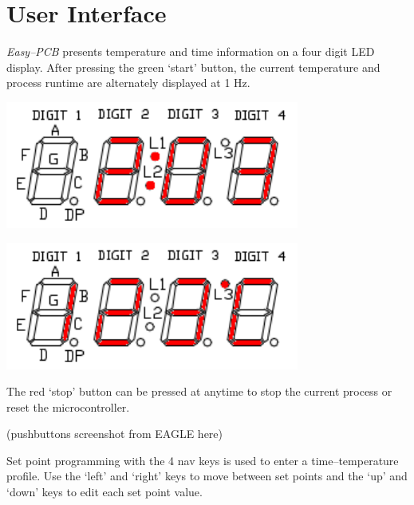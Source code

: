 \documentclass[10pt, twocolumn]{article}
\begin{document}
\tableofcontents

\section{User Interface}

\emph{Easy--PCB} presents temperature and time information on a four digit LED display.
After pressing the green `start' button, the current temperature and process
runtime are alternately displayed at 1 Hz.

\begin{center}
	\begin{minipage}[b]{0.5\columnwidth}
		\centering
		\includegraphics[width=\textwidth]{Figures/clock-display.pdf}
	\end{minipage}
	\begin{minipage}[b]{0.5\columnwidth}
		\centering
		\includegraphics[width=\textwidth]{Figures/temperature-display.pdf}
	\end{minipage}	
\end{center}

The red `stop' button can be pressed at anytime to stop the current process
or reset the microcontroller.

(pushbuttons screenshot from EAGLE here)

Set point programming with the 4 nav keys is used to enter a time--temperature profile.
Use the `left' and `right' keys to move between set points and the `up' and `down'
keys to edit each set point value.
\end{document}

